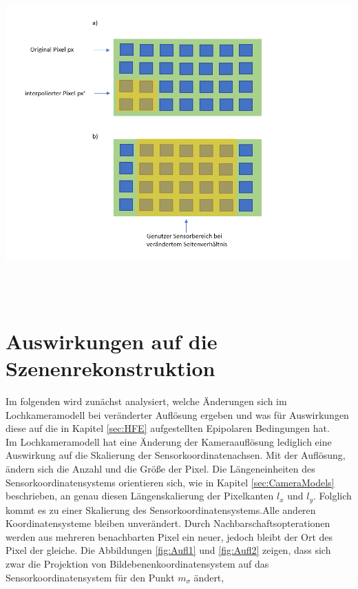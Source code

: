 \begin{minipage}{\linewidth}
	\centering
	\includegraphics[width=1.\linewidth]{images/AufloesungSensor.png}
	\label{fig:SensorResolutions}
\end{minipage}\\ \\

\section{Auswirkungen auf die Szenenrekonstruktion}

Im folgenden wird zunächst analysiert, welche Änderungen sich im Lochkameramodell bei veränderter Auflösung ergeben und was für Auswirkungen diese auf die in Kapitel \ref{sec:HFE} aufgestellten Epipolaren Bedingungen hat.\\

Im Lochkameramodell hat eine Änderung der Kameraauflösung lediglich eine Auswirkung auf die Skalierung der Sensorkoordinatenachsen. Mit der Auflösung, ändern sich die Anzahl und die Größe der Pixel. Die Längeneinheiten des Sensorkoordinatensystems orientieren sich, wie in Kapitel \ref{sec:CameraModels} beschrieben, an genau diesen Längenskalierung der Pixelkanten $l_x$ und $l_y$. Folglich kommt es zu einer Skalierung des Sensorkoordinatensystems.Alle anderen Koordinatensysteme bleiben unverändert. Durch Nachbarschaftsopterationen werden aus mehreren benachbarten Pixel ein neuer, jedoch bleibt der Ort des Pixel der gleiche\cite{Doessel}. Die Abbildungen \ref{fig:Aufl1} und \ref{fig:Aufl2} zeigen, dass sich zwar die Projektion von Bildebenenkoordinatensystem auf das Sensorkoordinatensystem für den Punkt $m_\sigma$ ändert, 

